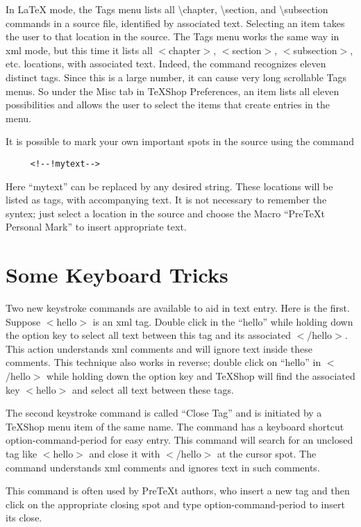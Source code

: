 \documentclass[11pt, oneside]{article}   	%
\begin{document}
In LaTeX mode, the Tags menu lists all \textbackslash chapter, \textbackslash section, and \textbackslash subsection commands in a  source file, identified by associated text. Selecting an item takes the user to that location in the source. The Tags menu works the same way in xml mode, but this time it lists all
$<$chapter$>$,  $<$section$>$, $<$subsection$>$, etc. locations, with associated text. Indeed, the command recognizes eleven distinct tags. Since this is a large number, it can cause very long scrollable Tags menus. So under the Misc tab in TeXShop Preferences, an item lists all eleven possibilities and allows the user to select the items that create entries in the menu.

It is possible to mark your own important spots in the source using the command
\begin{verbatim}
     <!--!mytext-->
\end{verbatim}

Here ``mytext'' can be replaced by any desired string. These locations will be listed as tags, with accompanying text. It is not necessary to remember the syntex; just select a location in the source and choose the Macro
``PreTeXt Personal Mark'' to insert appropriate text.

\section{Some Keyboard Tricks}

Two new keystroke commands are available to aid in text entry. Here is the first. Suppose $<$hello$>$ is an xml tag. Double click in the ``hello'' while holding down the option key to select all text between this tag and its associated $<$/hello$>$. This action understands xml comments and will ignore text inside these comments. This technique also works in reverse; double click on ``hello'' in $<$/hello$>$ while holding down the option key and TeXShop will find the associated key $<$hello$>$ and select all text between these tags. 

 
 The second keystroke command is called ``Close Tag'' and is initiated by a TeXShop menu item of the same name. The command has a keyboard shortcut option-command-period for easy entry. This command will search for an unclosed tag like $<$hello$>$ and close it with $<$/hello$>$ at the cursor spot. The command understands xml comments and ignores text in such comments. 
 
This command is often used by PreTeXt authors, who insert a new tag and then click on the appropriate closing spot and type option-command-period to insert its close. 
\end{document}
